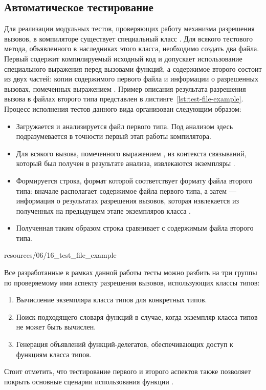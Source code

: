 \subsection{Автоматическое тестирование}

Для реализации модульных тестов, проверяющих работу механизма разрешения вызовов, в компиляторе существует специальный класс . Для всякого тестового метода, объявленного в наследниках этого класса, необходимо создать два файла. Первый содержит компилируемый исходный код и допускает использование специального выражения  перед вызовами функций, а содержимое второго состоит из двух частей: копии содержимого первого файла и информации о разрешенных вызовах, помеченных выражением . Пример описания результата разрешения вызова в файлах второго типа представлен в листинге~\ref{lst:test-file-example}. Процесс исполнения тестов данного вида организован следующим образом:
\begin{itemize}
    \item Загружается и анализируется файл первого типа. Под анализом здесь подразумевается в точности первый этап работы компилятора.
    \item Для всякого вызова, помеченного выражением , из контекста связываний, который был получен в результате анализа, извлекаются экземпляры . 
    \item Формируется строка, формат которой соответствует формату файла второго типа: вначале располагает содержимое файла первого типа, а затем --- информация о результатах разрешения вызовов, которая извлекается из полученных на предыдущем этапе экземпляров класса . 
    \item Полученная таким образом строка сравнивает с содержимым файла второго типа.
\end{itemize}


{resources/06/16_test_file_example}  

Все разработанные в рамках данной работы тесты можно разбить на три группы по проверяемому ими аспекту разрешения вызовов, использующих классы типов:
\begin{enumerate}
    \item Вычисление экземпляра класса типов для конкретных типов.
    \item Поиск подходящего словаря функций в случае, когда экземпляр класса типов не может быть вычислен.  
    \item Генерация объявлений функций-делегатов, обеспечивающих доступ к функциям класса типов.  
\end{enumerate}
Стоит отметить, что тестирование первого и второго аспектов также позволяет покрыть основные сценарии использования функции .

